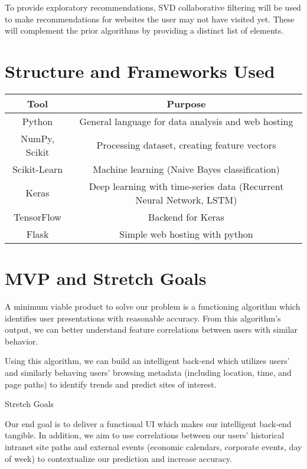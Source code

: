 \documentclass{article}
\begin{document}
To provide exploratory recommendations, SVD collaborative filtering will be used to 
make recommendations for websites the user may not have visited yet. These 
will complement the prior algorithms by providing a distinct list of elements. \\


\clearpage
\section*{Structure and Frameworks Used}
\begin{center}
 \begin{tabular}{|c | c |} 
 \hline
 Tool & Purpose \\ [0.5ex] 
 \hline\hline
 Python & General language for data analysis and web hosting\\ 
 \hline
 NumPy, Scikit & Processing dataset, creating feature vectors\\ 
 \hline
 Scikit-Learn & Machine learning (Naive Bayes classification) \\ 
 \hline
 Keras & Deep learning with time-series data (Recurrent Neural Network, LSTM) \\ 
 \hline
 TensorFlow & Backend for Keras \\ 
 \hline
 Flask & Simple web hosting with python \\ 
 \hline
\end{tabular}
\end{center}



\clearpage
\section*{MVP and Stretch Goals}
A minimum viable product to solve our problem is a functioning algorithm which identifies user presentations with reasonable accuracy. From this algorithm's output, we can better understand feature correlations between users with similar behavior.

Using this algorithm, we can build an intelligent back-end which utilizes users' and similarly behaving users' browsing metadata (including location, time, and page paths) to identify trends and predict sites of interest.

Stretch Goals

Our end goal is to deliver a functional UI which makes our intelligent back-end tangible. In addition, we aim to use correlations between our users' historical intranet site paths and external events (economic calendars, corporate events, day of week) to contextualize our prediction and increase accuracy.
\end{document}
